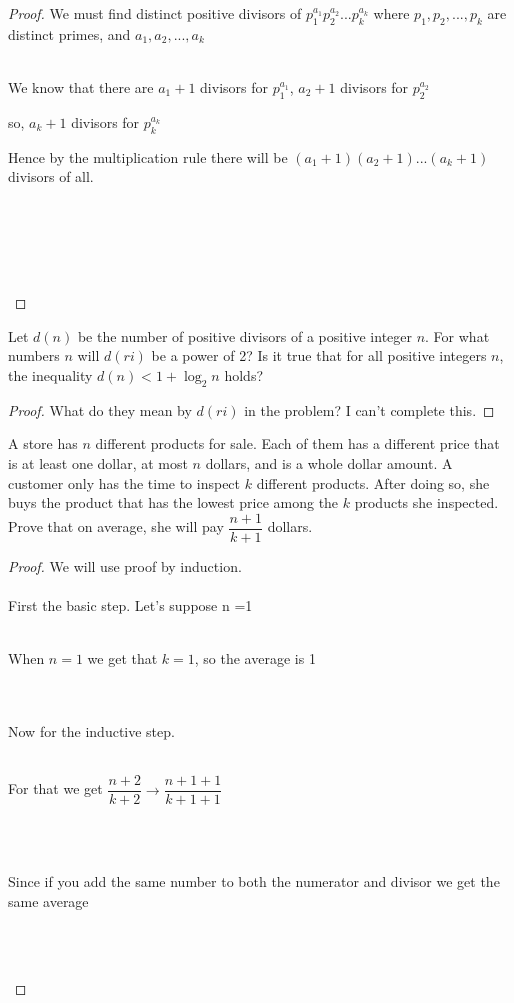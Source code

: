 \documentclass[12pt]{article}
\newenvironment{problem}[2][Problem]{\begin{trivlist}
\item[\hskip \labelsep {\bfseries #1}\hskip \labelsep {\bfseries #2.}]}{\end{trivlist}}
\begin{document}
\begin{proof}
We must find distinct positive divisors of $p_1^{a_1}p_2^{a_2}...p_k^{a_k}$ where $p_1,p_2,...,p_k$ are distinct primes, and $a_1,a_2,...,a_k$  \\ \\
\centerline{We know that there are $a_1+1$ divisors for $p_1^{a_1}$, $a_2+1$ divisors for $p_2^{a_2}$}
\centerline{so, $a_k+1$ divisors for $p_k^{a_k}$}
\centerline{Hence by the multiplication rule there will be $(a_1+1)(a_2+1)...(a_k+1)$ divisors of all.} \\ \\
\centerline{} \\ \\

\end{proof}
 
 \begin{problem}{9}
Let $d(n)$ be the number of positive divisors of a positive integer $n$. For what numbers $n$ will $d(ri)$ be a power of 2? Is it true that for all positive integers $n$, the inequality $d(n) < 1 + \log_2n$ holds?
\end{problem}
 
 \begin{proof}
What do they mean by $d(ri)$ in the problem? I can't complete this.
 \end{proof}
 
  \begin{problem}{10}
A store has $n$ different products for sale. Each of them has a different price that is at least one dollar, at most $n$ dollars, and is a whole dollar amount. A customer only has the time to inspect $k$ different products. After doing so, she buys the product that has the lowest price among the $k$ products she inspected. Prove that on average, she will pay $\dfrac{n+1}{k+1}$ dollars.
\end{problem}
 
 \begin{proof}
We will use proof by induction. \\ \\
First the basic step. Let's suppose n =1 \\ \\
\centerline{When $n=1$ we get that $k=1$, so the average is 1} \\ \\
Now for the inductive step. \\ \\
\centerline{For that we get $\dfrac{n+2}{k+2} \rightarrow \dfrac{n+1+1}{k+1+1}$} \\ \\
\centerline{Since if you add the same number to both the numerator and divisor we get the same average} \\ \\
\centerline{}
 \end{proof}
 
\end{document}
